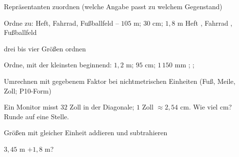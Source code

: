 \begin{aufgabe}{Repräsentanten zuordnen (welche Angabe passt zu welchem Gegenstand)}
\begin{teile}
\teil Ordne zu: Heft, Fahrrad, Fußballfeld – $105$ m; $30$ cm; $1{,}8$ m Heft \leerfeld , Fahrrad \leerfeld , Fußballfeld \leerfeld
\end{teile}
\end{aufgabe}

\begin{aufgabe}{drei bis vier Größen ordnen}
\begin{teile}
\teil Ordne, mit der kleinsten beginnend: $1{,}2$ m; $95$ cm; $1\,150$ mm \leerfeld ; \leerfeld ; \leerfeld
\end{teile}
\end{aufgabe}

\begin{aufgabe}{Umrechnen mit gegebenem Faktor bei nichtmetrischen Einheiten (Fuß, Meile, Zoll; P10-Form)}
\begin{teile}
\teil Ein Monitor misst $32$ Zoll in der Diagonale; $1$ Zoll $\approx 2{,}54$ cm. Wie viel cm? Runde auf eine Stelle. \leerfeld[cm]
\end{teile}
\end{aufgabe}

\begin{aufgabe}{Größen mit gleicher Einheit addieren und subtrahieren}
\begin{teile}
\teil $3{,}45$ m $+ 1{,}8$ m? \leerfeld[m]
\end{teile}
\end{aufgabe}

